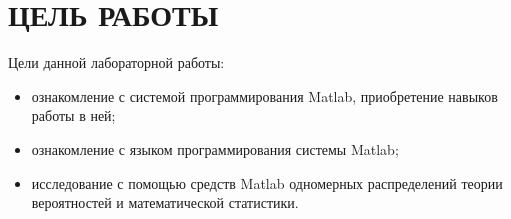 \section{ЦЕЛЬ РАБОТЫ}

Цели данной лабораторной работы:

\begin{itemize}
\item
  ознакомление с системой программирования Matlab, приобретение навыков работы в ней;
\item
  ознакомление с языком программирования системы Matlab;
\item
  исследование с помощью средств Matlab одномерных распределений теории вероятностей
  и математической статистики.
\end{itemize}

